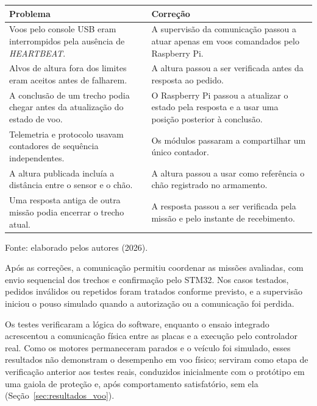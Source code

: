 \begin{quadro}[H]
    \centering
    \caption{Problemas identificados na integração e respectivas correções.}
    \label{qua:com_correcoes}
    \small
    \renewcommand{\arraystretch}{1.2}
    \begin{tabular}{|>{\raggedright\arraybackslash}p{6.5cm}|>{\raggedright\arraybackslash}p{7cm}|}
        \hline
        \textbf{Problema} & \textbf{Correção} \\
        \hline
        Voos pelo console USB eram interrompidos pela ausência de \textit{HEARTBEAT}. &
        A supervisão da comunicação passou a atuar apenas em voos comandados pelo Raspberry Pi. \\
        \hline
        Alvos de altura fora dos limites eram aceitos antes de falharem. &
        A altura passou a ser verificada antes da resposta ao pedido. \\
        \hline
        A conclusão de um trecho podia chegar antes da atualização do estado de voo. &
        O Raspberry Pi passou a atualizar o estado pela resposta e a usar uma posição posterior à conclusão. \\
        \hline
        Telemetria e protocolo usavam contadores de sequência independentes. &
        Os módulos passaram a compartilhar um único contador. \\
        \hline
        A altura publicada incluía a distância entre o sensor e o chão. &
        A altura passou a usar como referência o chão registrado no armamento. \\
        \hline
        Uma resposta antiga de outra missão podia encerrar o trecho atual. &
        A resposta passou a ser verificada pela missão e pelo instante de recebimento. \\
        \hline
    \end{tabular}
    \par\vspace{0.2cm}
    \footnotesize Fonte: elaborado pelos autores (2026).
\end{quadro}

Após as correções, a comunicação permitiu coordenar as missões avaliadas, com envio sequencial dos trechos e confirmação pelo STM32. Nos casos testados, pedidos inválidos ou repetidos foram tratados conforme previsto, e a supervisão iniciou o pouso simulado quando a autorização ou a comunicação foi perdida.

Os testes verificaram a lógica do software, enquanto o ensaio integrado acrescentou a comunicação física entre as placas e a execução pelo controlador real. Como os motores permaneceram parados e o veículo foi simulado, esses resultados não demonstram o desempenho em voo físico; serviram como etapa de verificação anterior aos testes reais, conduzidos inicialmente com o protótipo em uma gaiola de proteção e, após comportamento satisfatório, sem ela (Seção~\ref{sec:resultados_voo}).